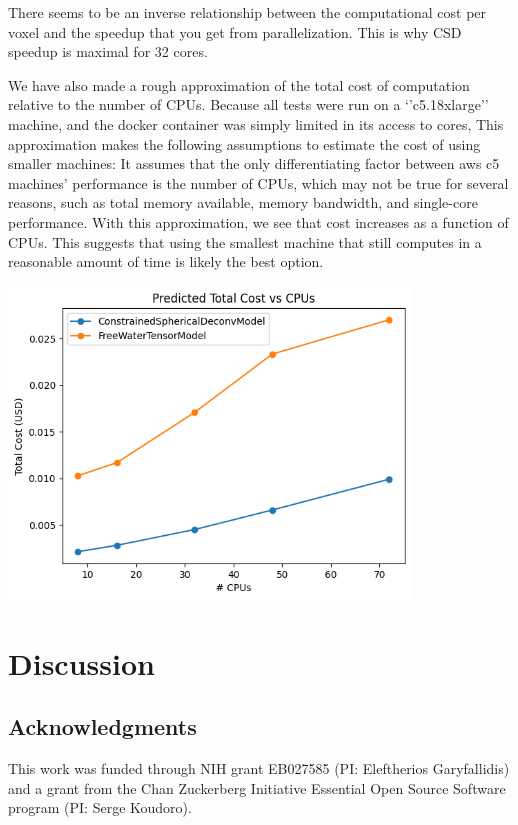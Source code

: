 \documentclass[
  letterpaper,
  DIV=11,
  numbers=noendperiod]{scrartcl}
\begin{document}
There seems to be an inverse relationship between the computational cost
per voxel and the speedup that you get from parallelization. This is why
CSD speedup is maximal for 32 cores.

We have also made a rough approximation of the total cost of computation
relative to the number of CPUs. Because all tests were run on a
`'c5.18xlarge'' machine, and the docker container was simply limited in
its access to cores, This approximation makes the following assumptions
to estimate the cost of using smaller machines: It assumes that the only
differentiating factor between aws c5 machines' performance is the
number of CPUs, which may not be true for several reasons, such as total
memory available, memory bandwidth, and single-core performance. With
this approximation, we see that cost increases as a function of CPUs.
This suggests that using the smallest machine that still computes in a
reasonable amount of time is likely the best option.

\includegraphics[width=0.8\textwidth,height=0.8\textheight]{figures/cost_vs_cpus.png}

\section{Discussion}\label{discussion}

\subsection{Acknowledgments}\label{acknowledgments}

This work was funded through NIH grant EB027585 (PI: Eleftherios
Garyfallidis) and a grant from the Chan Zuckerberg Initiative Essential
Open Source Software program (PI: Serge Koudoro).
\end{document}
